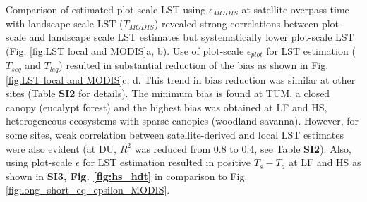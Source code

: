\documentclass[fleqn,10pt]{wlscirep}
\begin{document}
Comparison of estimated plot-scale LST using $\epsilon_{MODIS}$ at satellite overpass time with landscape scale LST ($T_{MODIS}$) revealed strong correlations between plot-scale and landscape scale LST estimates but systematically lower plot-scale LST (Fig. \ref{fig:LST local and MODIS}a, b). Use  of plot-scale $\epsilon_{plot}$ for LST estimation ($T_{seq}$ and $T_{leq}$) resulted in substantial reduction of the bias as shown in Fig. \ref{fig:LST local and MODIS}c, d. This trend in bias reduction was similar at other sites (Table \textbf{SI2} for details). The  minimum bias is found  at TUM, a closed canopy (eucalypt forest) and the highest bias was obtained at LF and HS, heterogeneous ecosystems with sparse canopies (woodland savanna). However, for some sites, weak correlation between satellite-derived and local LST estimates were also evident (at DU, $R^2$ was reduced from 0.8 to 0.4, see Table \textbf{SI2}). Also, using plot-scale $\epsilon$ for LST estimation resulted in positive $T_{s} - T_{a}$ at LF and HS as shown in \textbf{SI3, Fig. \ref{fig:hs_hdt}} in comparison to Fig. \ref{fig:long_short_eq_epsilon_MODIS}.  
\end{document}
